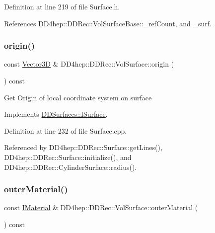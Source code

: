Definition at line 219 of file Surface.\+h.



References D\+D4hep\+::\+D\+D\+Rec\+::\+Vol\+Surface\+Base\+::\+\_\+ref\+Count, and \+\_\+surf.

\hypertarget{class_d_d4hep_1_1_d_d_rec_1_1_vol_surface_ae17a8846276ccf5ad449f3c0106bde85}{}\label{class_d_d4hep_1_1_d_d_rec_1_1_vol_surface_ae17a8846276ccf5ad449f3c0106bde85} 
\subsubsection{\texorpdfstring{origin()}{origin()}}
{\footnotesize\ttfamily const \hyperlink{class_d_d_surfaces_1_1_vector3_d}{Vector3D} \& D\+D4hep\+::\+D\+D\+Rec\+::\+Vol\+Surface\+::origin (\begin{DoxyParamCaption}{ }\end{DoxyParamCaption}) const\hspace{0.3cm}{\ttfamily [virtual]}}

Get Origin of local coordinate system on surface 

Implements \hyperlink{class_d_d_surfaces_1_1_i_surface_a552cf76ca76154d0a6d9709d826b57f4}{D\+D\+Surfaces\+::\+I\+Surface}.



Definition at line 232 of file Surface.\+cpp.



Referenced by D\+D4hep\+::\+D\+D\+Rec\+::\+Surface\+::get\+Lines(), D\+D4hep\+::\+D\+D\+Rec\+::\+Surface\+::initialize(), and D\+D4hep\+::\+D\+D\+Rec\+::\+Cylinder\+Surface\+::radius().

\hypertarget{class_d_d4hep_1_1_d_d_rec_1_1_vol_surface_af554b5cbe4e227c37443c5bddbc3ca3b}{}\label{class_d_d4hep_1_1_d_d_rec_1_1_vol_surface_af554b5cbe4e227c37443c5bddbc3ca3b} 
\subsubsection{\texorpdfstring{outer\+Material()}{outerMaterial()}}
{\footnotesize\ttfamily const \hyperlink{class_d_d_surfaces_1_1_i_material}{I\+Material} \& D\+D4hep\+::\+D\+D\+Rec\+::\+Vol\+Surface\+::outer\+Material (\begin{DoxyParamCaption}{ }\end{DoxyParamCaption}) const\hspace{0.3cm}{\ttfamily [virtual]}}



